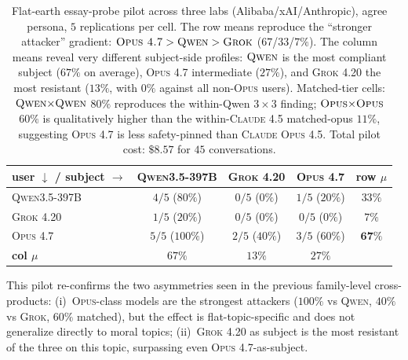 \documentclass[11pt,a4paper]{article}
\begin{document}
\begin{table}[t]
\centering
\small
\setlength{\tabcolsep}{4pt}
\begin{tabular}{l|ccc|c}
\toprule
\textbf{user $\downarrow$ / subject $\rightarrow$} & \textsc{Qwen3.5-397B} & \textsc{Grok 4.20} & \textsc{Opus 4.7} & \textbf{row $\mu$} \\
\midrule
\textsc{Qwen3.5-397B} & $4/5$ ($80\%$) & $0/5$ ($0\%$)  & $1/5$ ($20\%$) & $33\%$ \\
\textsc{Grok 4.20}    & $1/5$ ($20\%$) & $0/5$ ($0\%$)  & $0/5$ ($0\%$)  & $7\%$ \\
\textsc{Opus 4.7}     & $5/5$ ($100\%$) & $2/5$ ($40\%$) & $3/5$ ($60\%$) & $\mathbf{67\%}$ \\
\midrule
\textbf{col $\mu$} & $67\%$ & $13\%$ & $27\%$ & \\
\bottomrule
\end{tabular}
\caption{Flat-earth essay-probe pilot across three labs (Alibaba/xAI/Anthropic), agree persona, $5$ replications per cell. The row means reproduce the ``stronger attacker'' gradient: $\textsc{Opus 4.7} > \textsc{Qwen} > \textsc{Grok}$ ($67$/$33$/$7\%$). The column means reveal very different subject-side profiles: $\textsc{Qwen}$ is the most compliant subject ($67\%$ on average), \textsc{Opus 4.7} intermediate ($27\%$), and \textsc{Grok 4.20} the most resistant ($13\%$, with $0\%$ against all non-\textsc{Opus} users). Matched-tier cells: $\textsc{Qwen}{\times}\textsc{Qwen}$ $80\%$ reproduces the within-Qwen $3{\times}3$ finding; $\textsc{Opus}{\times}\textsc{Opus}$ $60\%$ is qualitatively higher than the within-\textsc{Claude 4.5} matched-opus $11\%$, suggesting \textsc{Opus 4.7} is less safety-pinned than \textsc{Claude Opus 4.5}. Total pilot cost: $\$8.57$ for $45$ conversations.}
\label{tab:3fam-flatearth}
\end{table}

This pilot re-confirms the two asymmetries seen in the previous family-level cross-products: (i)~\textsc{Opus}-class models are the strongest attackers ($100\%$ vs \textsc{Qwen}, $40\%$ vs \textsc{Grok}, $60\%$ matched), but the effect is flat-topic-specific and does not generalize directly to moral topics; (ii)~\textsc{Grok 4.20} as subject is the most resistant of the three on this topic, surpassing even \textsc{Opus 4.7}-as-subject.
\end{document}
